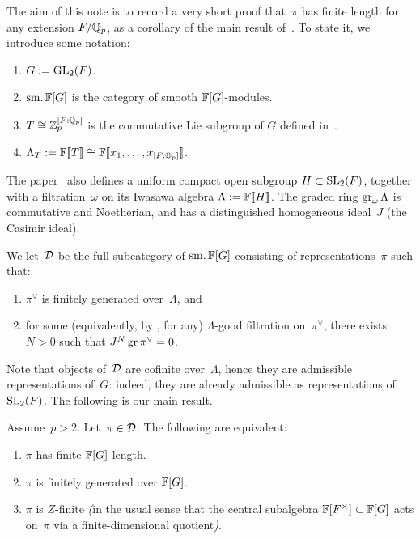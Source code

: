 \documentclass[oneside,a4paper,english, 11pt]{amsart}
\begin{document}
The aim of this note is to record a very short proof that~$\pi$ has finite length for any extension $F/\mathbb{Q}_p$, as a corollary of the main result of~\cite{Zhao}.
To state it, we introduce some notation:
\begin{enumerate}
    \item $G := \mathrm{GL}_2(F)$.
    \item $\operatorname{sm.} \mathbb{F}[G]$ is the category of smooth $\mathbb{F}[G]$-modules.
    \item $T \cong \mathbb{Z}_p^{[F:\mathbb{Q}_p]}$ is the commutative Lie subgroup of $G$ defined in~\cite{Zhao}.
    \item $\Lambda_T := \mathbb{F}[\![T]\!] \cong \mathbb{F}[\![x_1, \ldots, x_{[F:\mathbb{Q}_p]}]\!]$.
\end{enumerate}
The paper~\cite{Zhao} also defines a uniform compact open subgroup $H \subset \mathrm{SL}_2(F)$, together with a filtration~$\omega$ on its Iwasawa algebra $\Lambda := \mathbb{F}[\![H]\!]$.
The graded ring $\operatorname{gr}_\omega \Lambda$ is commutative and Noetherian, and has a distinguished homogeneous ideal~$J$ (the Casimir ideal).

\begin{defn}
    We let~$\mathcal{D}$ be the full subcategory of $\operatorname{sm.} \mathbb{F}[G]$ consisting of representations~$\pi$ such that: 
    \begin{enumerate}
    \item $\pi^\vee$ is finitely generated over~$\Lambda$, and 
    \item for some (equivalently, by \cite[Lem.\ 2.2]{Zhao}, for any) $\Lambda$-good filtration on~$\pi^\vee$, there exists~$N>0$ such that
    $J^N \operatorname{gr} \pi^\vee = 0$.
    \end{enumerate}
\end{defn}

Note that objects of~$\mathcal{D}$ are cofinite over~$\Lambda$, hence they are admissible representations of~$G$:
indeed, they are already admissible as representations of $\mathrm{SL}_2(F)$.
The following is our main result.

\begin{thm}\label{thm:main}
    Assume~$p > 2$.
    Let~$\pi \in \mathcal{D}$. 
    The following are equivalent:
    \begin{enumerate}
    \item $\pi$ has finite $\mathbb{F}[G]$-length.
    \item $\pi$ is finitely generated over $\mathbb{F}[G]$.
    \item $\pi$ is $Z$-finite {\em (}in the usual sense that the central subalgebra 
    $\mathbb{F}[F^\times] \subset \mathbb{F}[G]$ acts on~$\pi$ via a finite-dimensional quotient{\em )}.
    \end{enumerate}
\end{thm}
\end{document}
